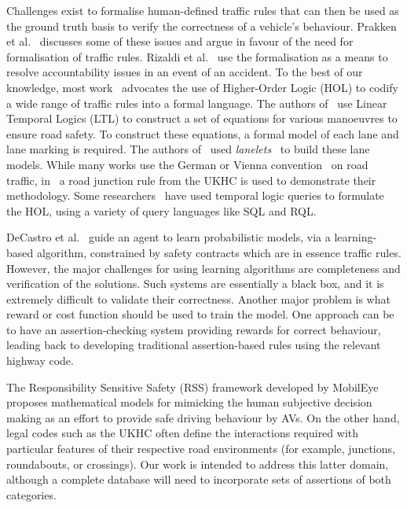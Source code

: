 
Challenges exist to formalise human-defined traffic rules that can then be used as the ground truth %
basis
to verify the correctness of a vehicle's behaviour. 
%
Prakken et al.~\cite{lawabidingstudy} discusses some of these issues and argue in favour of the need for formalisation of traffic rules. Rizaldi et al.~\cite{acountability} use the formalisation as a means to resolve accountability issues in an event of an accident. To the best of our knowledge, most work~\cite{acountability, esterle, rizaldi, alves} advocates the use of Higher-Order Logic (HOL) to codify a wide range of traffic rules into a formal language. The authors of~\cite{acountability, esterle, rizaldi, alves} use Linear Temporal Logics (LTL) to construct a set of equations for various manoeuvres to ensure road safety. To construct these equations, a formal model of each lane and lane marking is required. The authors of~\cite{rizaldi} used \textit{lanelets}~\cite{lanelets2014} to build these lane models. While many works use the German or Vienna convention~\cite{vienna} on road traffic, in~\cite{alves} a road junction rule from the UKHC is used to demonstrate their methodology. Some researchers~\cite{sqlhuang, sqlgueffaz} have used temporal logic queries to formulate the HOL, using a variety of query languages like SQL and RQL. 

DeCastro et al.~\cite{decastro2018counterexample} guide an agent to learn probabilistic models, via a learning-based algorithm, constrained by safety contracts which are in essence traffic rules. However, the major challenges for using learning algorithms are completeness and verification of the solutions. Such systems are essentially a black box, and it is extremely difficult to validate their correctness. Another major problem is what reward or cost function should be used to train the model. One approach can be to have an %
assertion-checking system
providing rewards for correct behaviour, %
leading
back to developing traditional assertion-based rules using the relevant highway code.

The Responsibility Sensitive Safety (RSS) framework developed by MobilEye~\cite{RSS_Shalev_Shwartz2017, RSS2_Koopman2019} proposes mathematical models for mimicking the human subjective decision making as an effort to provide safe driving behaviour by AVs. On the other hand, legal codes such as the UKHC often define the interactions required with particular features of their respective road environments (for example, junctions, roundabouts, or crossings). Our work is intended to address this latter domain, although a complete database will need to incorporate sets of assertions of both categories. 

